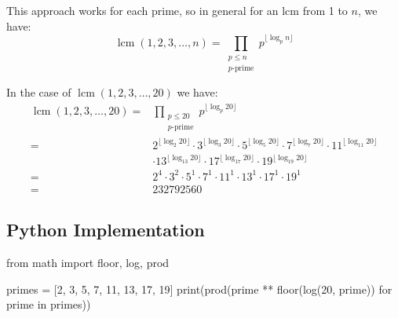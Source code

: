 \documentclass{article}
\DeclareMathOperator{\lcm}{lcm}
\begin{document}
This approach works for each prime, so in general for an lcm from 1 to \(n\), we have:
\[\lcm(1, 2, 3, \dots, n) = \prod_{\substack{p \leq n\\p\text{-prime}}}{p^{\lfloor \log_p{n} \rfloor}}\]

In the case of \(\lcm(1, 2, 3, \dots, 20)\) we have:
\[\begin{aligned}
    \lcm(1, 2, 3, \dots, 20) ={}& \prod_{\substack{p \leq 20\\p\text{-prime}}}{p^{\lfloor \log_p{20} \rfloor}} \\
    ={}& 2^{\lfloor \log_2{20} \rfloor} \cdot 3^{\lfloor \log_3{20} \rfloor} \cdot 5^{\lfloor \log_5{20} \rfloor} \cdot 7^{\lfloor \log_7{20} \rfloor} \cdot 11^{\lfloor \log_{11}{20} \rfloor} \\
    {}& \cdot 13^{\lfloor \log_{13}{20} \rfloor} \cdot 17^{\lfloor \log_{17}{20} \rfloor} \cdot 19^{\lfloor \log_{19}{20} \rfloor} \\
    ={}& 2^4 \cdot 3^2 \cdot 5^1 \cdot 7^1 \cdot 11^1 \cdot 13^1 \cdot 17^1 \cdot 19^1 \\
    ={}& 232792560
\end{aligned}\]

\subsection*{Python Implementation}
\begin{pyverbatim}[][frame=single]
from math import floor, log, prod

primes = [2, 3, 5, 7, 11, 13, 17, 19]
print(prod(prime ** floor(log(20, prime)) for prime in primes))
\end{pyverbatim}
\end{document}
